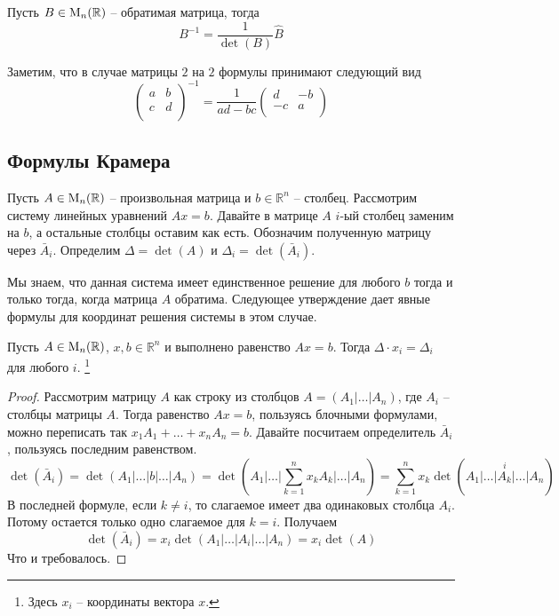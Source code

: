 \begin{claim}
Пусть $B\in\operatorname{M}_{n}(\mathbb R)$ -- обратимая матрица, тогда 
\[
B^{-1} = \frac{1}{\det(B)}\hat B
\]
\end{claim}

Заметим, что в случае матрицы $2$ на $2$ формулы принимают следующий вид
\[
\begin{pmatrix}
{a}&{b}\\
{c}&{d}\\
\end{pmatrix}^{-1}
=
\frac{1}{ad - bc}
\begin{pmatrix}
{d}&{-b}\\
{-c}&{a}\\
\end{pmatrix}
\]


\subsection{Формулы Крамера}

Пусть $A\in\operatorname{M}_{n}(\mathbb R)$ -- произвольная матрица и $b\in\mathbb R^n$ -- столбец.
Рассмотрим систему линейных уравнений $Ax = b$.
Давайте в матрице $A$ $i$-ый столбец заменим на $b$, а остальные столбцы оставим как есть.
Обозначим полученную матрицу через $\bar A_i$.
Определим $\Delta = \det (A)$ и $\Delta_i = \det (\bar A_i)$.

Мы знаем, что данная система имеет единственное решение для любого $b$ тогда и только тогда, когда матрица $A$ обратима.
Следующее утверждение дает явные формулы для координат решения системы в этом случае.

\begin{claim}
Пусть $A\in\operatorname{M}_{n}(\mathbb R)$, $x,b\in \mathbb R^n$ и выполнено равенство $Ax = b$.
Тогда $\Delta \cdot x_i = \Delta_i$ для любого $i$.%
\footnote{Здесь $x_i$ -- координаты вектора $x$.}
\end{claim}
\begin{proof}
Рассмотрим матрицу $A$ как строку из столбцов $A = (A_1|\ldots|A_n)$, где $A_i$ -- столбцы матрицы $A$.
Тогда равенство $Ax = b$, пользуясь блочными формулами, можно переписать так $x_1 A_1 + \ldots + x_n A_n = b$.
Давайте посчитаем определитель $\bar A_i$, пользуясь последним равенством.
\[
\det (\bar A_i) = \det(A_1|\ldots|b|\ldots|A_n) = \det(A_1|\ldots|\sum_{k=1}^n x_k A_k|\ldots|A_n) = \sum_{k=1}^n x_k \det (
\stackrel{i}{A_1|\ldots|A_k|\ldots|A_n})
\]
В последней формуле, если $k\neq i$, то слагаемое имеет два одинаковых столбца $A_i$.
Потому остается только одно слагаемое для $k = i$.
Получаем
\[
\det(\bar A_i) = x_i \det(A_1|\ldots|A_i|\ldots|A_n) = x_i \det(A)
\]
Что и требовалось.
\end{proof}

